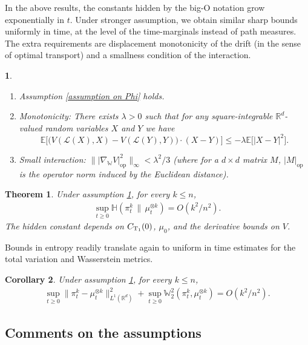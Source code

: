 \documentclass[11pt,reqno]{amsart}
\makeatletter
\numberwithin{equation}{section}
\newtheorem{theorem}{Theorem}[section]
\newtheorem{corollary}[theorem]{Corollary}
\newtheorem*{assumption*}{\assumptionnumber}
\providecommand{\assumptionnumber}{}
\newenvironment{assumption}[1]
 {%
  \renewcommand{\assumptionnumber}{Assumption #1}%
  \begin{assumption*}%
  \protected@edef\@currentlabel{\textbf{\textup {#1}}}%
 }
 {%
  \end{assumption*}
 }
\theoremstyle{definition}
\def\E{{\mathbb E}}
\def\R{{\mathbb R}}
\def\Law{\mathcal{L}}
\newcommand{\wgrad}{\nabla_{\W}}
\newcommand{\W}{\mathbb W}
\newcommand{\ent}{ \mathbb H}
\makeatother
\begin{document}
In the above results, the constants hidden by the big-O notation grow exponentially in $t$. Under stronger assumption, we obtain similar sharp bounds uniformly in time, at the level of the time-marginals instead of path measures. The extra requirements are displacement monotonicity of the drift (in the sense of optimal transport) and a smallness condition of the interaction.

\begin{assumption}{(UiT)} { \ }
\begin{enumerate}
\item Assumption \ref{assumption on Phi} holds.
\item Monotonicity: There exists $\lambda>0$ such that for any square-integrable $\R^d$-valued random variables $X$ and $Y$ we have
\begin{equation*}
    \E\Big[\big( V(\Law(X),X)- V(\Law(Y),Y)\big)\cdot(X-Y)\Big]\leq -\lambda \E\Big[|X-Y|^2\Big].
\end{equation*}
\item Small interaction: $ \||\wgrad V|^2_{\text{op}}\|_\infty<\lambda^2/3$ (where for a $d\times d$ matrix $M$, $|M|_{\text{op}}$ is the operator norm induced by the Euclidean distance). 
\end{enumerate}
\label{Assumption: UiT}
\end{assumption}


\begin{theorem}
\label{th: UiT}
    Under assumption \ref{Assumption: UiT}, for every $k\leq n$,
    \begin{align*}
        \sup_{t\geq 0} \ent(\pi_t^k\,\|\,\mu_t^{\otimes k})=O(k^2/n^2).
    \end{align*}
     The hidden constant depends on $C_{\textup{T}_1}(0)$, $\mu_0$, and the derivative bounds on $ V$.
\end{theorem}
Bounds in entropy readily translate again to uniform in time estimates for the total variation and Wasserstein metrics.
\begin{corollary}
\label{cr: metric convergence UiT}
Under assumption \ref{Assumption: UiT}, for every $k \le n$,
\begin{align*}
    \sup_{t\geq 0}\|\pi_t^{k}-\mu_t^{\otimes k}\|^2_{L^1(\R^d)}+\sup_{t\geq 0} \W_2^2(\pi_t^k,\mu_t^{\otimes k})= O(k^2/n^2).
\end{align*}     
\end{corollary}

\subsection{Comments on the assumptions}
\end{document}
